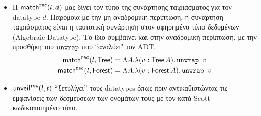 \begin{itemize}
  \item Η $\mathsf{match}^{\operatorname{\texttt{rec}}}(l, d)$ μας δίνει τον τύπο της συνάρτησης ταιριάσματος για τον datatype $d$. Παρόμοια
  με την μη αναδρομική περίπτωση, η συνάρτηση ταιριάσματος είναι η ταυτοτική  συνάρτηση στον αφηρημένο τύπο δεδομένων (Algebraic Datatype). Το ίδιο συμβαίνει και στην αναδρομική περίπτωση, με την προσθήκη του  $\operatorname{\texttt{unwrap}}$ που ``αναλύει" τον ADT.
    \begin{align*}
    \mathsf{match}^{\operatorname{\texttt{rec}}}(l, \operatorname{\textsf{Tree}}) &= \Lambda A . \lambda (v : \operatorname{\textsf{Tree}} A) . \operatorname{\texttt{unwrap}}\ v\\
    \mathsf{match}^{\operatorname{\texttt{rec}}}(l, \operatorname{\textsf{Forest}}) &= \Lambda A . \lambda (v : \operatorname{\textsf{Forest}} A) . \operatorname{\texttt{unwrap}}\ v
    \end{align*}
  \item $\mathsf{unveil}^{\operatorname{\texttt{rec}}}(l, t)$ ``ξετυλίγει'' τους datatypes όπως πριν αντικαθιστώντας τις
  εμφανίσεις των δεσμεύσεων των ονομάτων τους με τον κατά Scott κωδικοποιημένο τύπο.
\end{itemize}